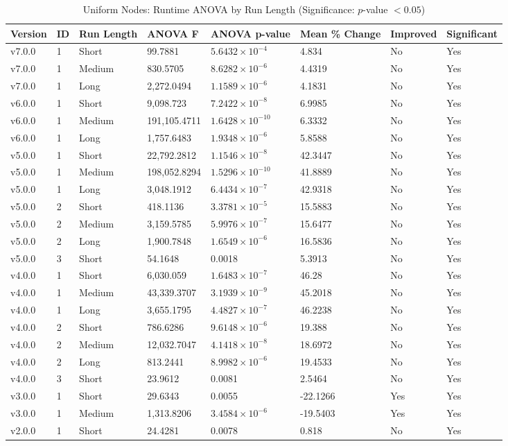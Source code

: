 \begin{table}[H]\caption{Uniform Nodes: Runtime ANOVA by Run Length (Significance: $p$-value $<0.05$)}
\centering\footnotesize\setlength{\tabcolsep}{4pt}\renewcommand{\arraystretch}{1.15}
\begin{tabular}{llllllll}
\toprule
Version & ID & Run Length & ANOVA F & ANOVA p-value & Mean \% Change & Improved & Significant \\ \midrule
v7.0.0 & 1 & Short & 99.7881 & $5.6432\times10^{-4}$ & 4.834 & No & Yes \\
v7.0.0 & 1 & Medium & 830.5705 & $8.6282\times10^{-6}$ & 4.4319 & No & Yes \\
v7.0.0 & 1 & Long & 2,272.0494 & $1.1589\times10^{-6}$ & 4.1831 & No & Yes \\
v6.0.0 & 1 & Short & 9,098.723 & $7.2422\times10^{-8}$ & 6.9985 & No & Yes \\
v6.0.0 & 1 & Medium & 191,105.4711 & $1.6428\times10^{-10}$ & 6.3332 & No & Yes \\
v6.0.0 & 1 & Long & 1,757.6483 & $1.9348\times10^{-6}$ & 5.8588 & No & Yes \\
v5.0.0 & 1 & Short & 22,792.2812 & $1.1546\times10^{-8}$ & 42.3447 & No & Yes \\
v5.0.0 & 1 & Medium & 198,052.8294 & $1.5296\times10^{-10}$ & 41.8889 & No & Yes \\
v5.0.0 & 1 & Long & 3,048.1912 & $6.4434\times10^{-7}$ & 42.9318 & No & Yes \\
v5.0.0 & 2 & Short & 418.1136 & $3.3781\times10^{-5}$ & 15.5883 & No & Yes \\
v5.0.0 & 2 & Medium & 3,159.5785 & $5.9976\times10^{-7}$ & 15.6477 & No & Yes \\
v5.0.0 & 2 & Long & 1,900.7848 & $1.6549\times10^{-6}$ & 16.5836 & No & Yes \\
v5.0.0 & 3 & Short & 54.1648 & 0.0018 & 5.3913 & No & Yes \\
v4.0.0 & 1 & Short & 6,030.059 & $1.6483\times10^{-7}$ & 46.28 & No & Yes \\
v4.0.0 & 1 & Medium & 43,339.3707 & $3.1939\times10^{-9}$ & 45.2018 & No & Yes \\
v4.0.0 & 1 & Long & 3,655.1795 & $4.4827\times10^{-7}$ & 46.2238 & No & Yes \\
v4.0.0 & 2 & Short & 786.6286 & $9.6148\times10^{-6}$ & 19.388 & No & Yes \\
v4.0.0 & 2 & Medium & 12,032.7047 & $4.1418\times10^{-8}$ & 18.6972 & No & Yes \\
v4.0.0 & 2 & Long & 813.2441 & $8.9982\times10^{-6}$ & 19.4533 & No & Yes \\
v4.0.0 & 3 & Short & 23.9612 & 0.0081 & 2.5464 & No & Yes \\
v3.0.0 & 1 & Short & 29.6343 & 0.0055 & -22.1266 & Yes & Yes \\
v3.0.0 & 1 & Medium & 1,313.8206 & $3.4584\times10^{-6}$ & -19.5403 & Yes & Yes \\
v2.0.0 & 1 & Short & 24.4281 & 0.0078 & 0.818 & No & Yes \\
\bottomrule\end{tabular}
\label{AnovaUniformNodes}
\par\smallskip\parbox{0.95\textwidth}{\scriptsize}
\end{table}

